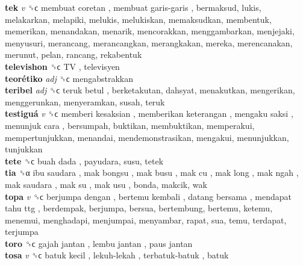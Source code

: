 \textbf{tek} \emph{v}  ␝ϲ   membuat coretan ,  membuat garis-garis , bermaksud, lukis, melakarkan, melapiki, melukis, melukiskan, memaksudkan, membentuk, memerikan, menandakan, menarik, mencorakkan, menggambarkan, menjejaki, menyusuri, merancang, merancangkan, merangkakan, mereka, merencanakan, merunut, pelan, rancang, rekabentuk  \\
\textbf{televishon} ␝ϲ   TV , televisyen  \\
\textbf{teorétiko} \emph{adj}  ␝ϲ  mengabstrakkan  \\
\textbf{teribel} \emph{adj}  ␝ϲ   teruk betul , berketakutan, dahsyat, menakutkan, mengerikan, menggerunkan, menyeramkan, susah, teruk  \\
\textbf{testiguá} \emph{v}  ␝ϲ   memberi kesaksian ,  memberikan keterangan ,  mengaku saksi ,  menunjuk cara , bersumpah, buktikan, membuktikan, memperakui, mempertunjukkan, menandai, mendemonstrasikan, mengakui, menunjukkan, tunjukkan  \\
\textbf{tete} ␝ϲ   buah dada , payudara, susu, tetek  \\
\textbf{tia} ␝α   ibu saudara ,  mak bongsu ,  mak busu ,  mak cu ,  mak long ,  mak ngah ,  mak saudara ,  mak su ,  mak usu , bonda, makcik, wak  \\
\textbf{topa} \emph{v}  ␝ϲ   berjumpa dengan ,  bertemu kembali ,  datang bersama ,  mendapat tahu ttg , berdempak, berjumpa, bersua, bertembung, bertemu, ketemu, menemui, menghadapi, menjumpai, menyambar, rapat, sua, temu, terdapat, terjumpa  \\
\textbf{toro} ␝ϲ   gajah jantan ,  lembu jantan ,  paus jantan   \\
\textbf{tosa} \emph{v}  ␝ϲ   batuk kecil ,  lekuh-lekah ,  terbatuk-batuk , batuk  \\
